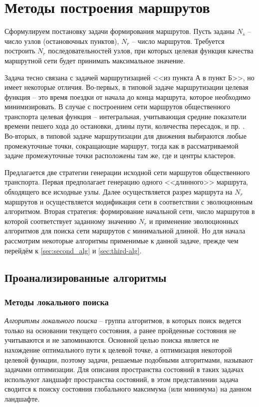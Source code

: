 \chapter{Методы построения маршрутов}
Сформулируем постановку задачи формирования маршрутов. Пусть заданы \( N_s \) – число узлов (остановочных 
пунктов), \( N_r \) – число маршрутов. Требуется построить \( N_r \) последовательностей узлов, при которых 
целевая функция качества маршрутной сети будет принимать максимальное значение. 

Задача тесно связана с задачей маршрутизацией <<из пункта А в пункт Б>>, но имеет некоторые отличия. 
Во-первых, в типовой задаче маршрутизации целевая функция – это время поездки от начала до конца маршрута, 
которое необходимо минимизировать. В случае с построением сети маршрутов общественного транспорта целевая 
функция -- интегральная, учитывающая средние показатели времени пешего хода до остановки, длины пути, 
количества пересадок, и пр. \cite{bib:9,bib:17}. Во-вторых, в типовой задаче маршрутизации для движения 
выбираются любые промежуточные точки, сокращающие маршрут, тогда как в рассматриваемой задаче промежуточные 
точки расположены там же, где и центры кластеров.

Предлагается две стратегии генерации исходной сети маршрутов общественного транспорта. Первая предполагает 
генерацию одного <<длинного>> маршрута, обходящего все исходные узлы. Далее осуществляется разрез маршрута 
на \( N_r \) маршрутов и осуществляется модификация сети в соответствии с эволюционным алгоритмом. Вторая 
стратегия: формирование начальной сети, число маршрутов в которой соответствует заданному значению \( N_r \) 
и применение эволюционных алгоритмов для поиска сети маршрутов с минимальной длиной. Но для начала рассмотрим 
некоторые алгоритмы применимые к данной задаче, прежде чем перейдём к \ref{sec:second_alg} и 
\ref{sec:third-alg}.

\section{Проанализированные алгоритмы}
\subsection{Методы локального поиска}
\emph{Алгоритмы локального поиска} -- группа алгоритмов, в которых поиск ведется только на основании текущего 
состояния, а ранее пройденные состояния не учитываются и не запоминаются. Основной целью поиска является не 
нахождение оптимального пути к целевой точке, а оптимизация некоторой целевой функции, поэтому задачи, 
решаемые подобными алгоритмами, называют задачами оптимизации. Для описания пространства состояний в таких 
задачах используют ландшафт пространства состояний, в этом представлении задача сводится к поиску состояния 
глобального максимума (или минимума) на данном ландшафте.

